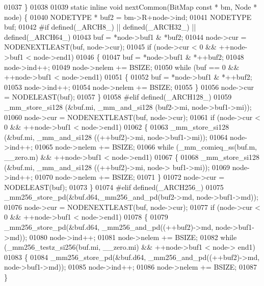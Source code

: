 \begin{DoxyCode}
01037 \}
01038 
01039 \textcolor{keyword}{static} \textcolor{keyword}{inline} \textcolor{keywordtype}{void} nextCommon(BitMap \textcolor{keyword}{const} * bm, Node * node) \{
01040         NODETYPE * buf2 = bm->R+node->ind;
01041     NODETYPE buf;
01042 \textcolor{preprocessor}{#if defined(\_ARCH8\_) || defined(\_ARCH32\_) || defined(\_ARCH64\_)}
01043     buf = *node->buf1 & *buf2;
01044     node->cur = NODENEXTLEAST(buf, node->cur);
01045     \textcolor{keywordflow}{if} (node->cur < 0 && ++node->buf1 < node->end1)
01046     \{
01047         buf = *node->buf1 & *++buf2;
01048                 node->ind++;
01049                 node->nelem += BSIZE;
01050         \textcolor{keywordflow}{while} (buf == 0 && ++node->buf1 < node->end1)
01051         \{
01052             buf = *node->buf1 & *++buf2;
01053                 node->ind++;
01054                 node->nelem += BSIZE;
01055         \}
01056         node->cur = NODELEAST(buf);
01057     \}
01058 \textcolor{preprocessor}{#elif defined(\_ARCH128\_)}
01059     \_mm\_store\_si128 (&buf.mi, \_mm\_and\_si128 (buf2->mi, node->buf1->mi));
01060     node->cur = NODENEXTLEAST(buf, node->cur);
01061     \textcolor{keywordflow}{if} (node->cur < 0 && ++node->buf1 < node->end1)
01062     \{
01063         \_mm\_store\_si128 (&buf.mi, \_mm\_and\_si128 ((++buf2)->mi, node->buf1->mi));
01064                 node->ind++;
01065                 node->nelem += BSIZE;
01066         \textcolor{keywordflow}{while} (\_mm\_comieq\_ss(buf.m, \_\_zero.m) && ++node->buf1 < node->end1)
01067         \{
01068                 \_mm\_store\_si128 (&buf.mi, \_mm\_and\_si128 ((++buf2)->mi, node->
      buf1->mi));
01069                 node->ind++;
01070                 node->nelem += BSIZE;
01071         \}
01072         node->cur = NODELEAST(buf);
01073     \}
01074 \textcolor{preprocessor}{#elif defined(\_ARCH256\_)}
01075     \_mm256\_store\_pd(&buf.d64,\_mm256\_and\_pd(buf2->md, node->buf1->md));
01076     node->cur = NODENEXTLEAST(buf, node->cur);
01077     \textcolor{keywordflow}{if} (node->cur < 0 && ++node->buf1 < node->end1)
01078     \{
01079         \_mm256\_store\_pd(&buf.d64, \_mm256\_and\_pd((++buf2)->md, node->buf1->md));
01080                 node->ind++;
01081                 node->nelem += BSIZE;
01082         \textcolor{keywordflow}{while} (\_mm256\_testz\_si256(buf.mi, \_\_zero.mi) && ++node->buf1 < node->
      end1)
01083         \{
01084                 \_mm256\_store\_pd(&buf.d64, \_mm256\_and\_pd((++buf2)->md, node->buf1->md));
01085                 node->ind++;
01086                 node->nelem += BSIZE;
01087         \}

\end{DoxyCode}
